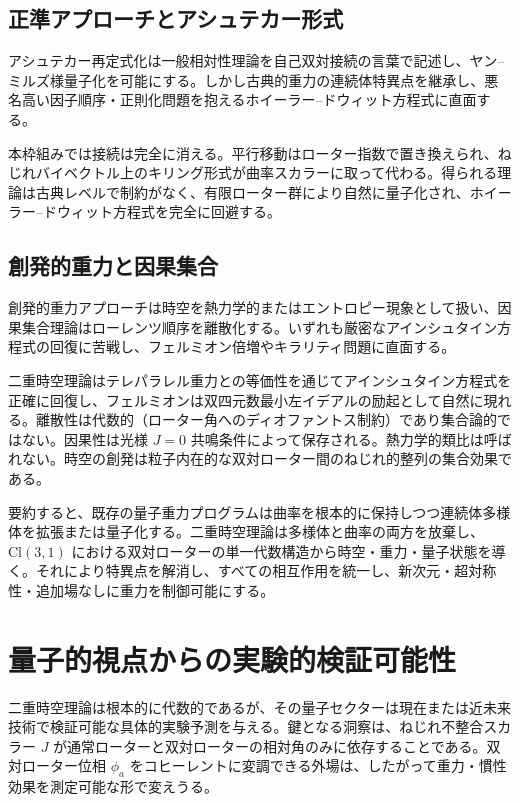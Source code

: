 \documentclass[a4paper]{article}
\begin{document}
\subsection{正準アプローチとアシュテカー形式}

アシュテカー再定式化は一般相対性理論を自己双対接続の言葉で記述し、ヤン--ミルズ様量子化を可能にする。しかし古典的重力の連続体特異点を継承し、悪名高い因子順序・正則化問題を抱えるホイーラー--ドウィット方程式に直面する。

本枠組みでは接続は完全に消える。平行移動はローター指数で置き換えられ、ねじれバイベクトル上のキリング形式が曲率スカラーに取って代わる。得られる理論は古典レベルで制約がなく、有限ローター群により自然に量子化され、ホイーラー--ドウィット方程式を完全に回避する。

\subsection{創発的重力と因果集合}

創発的重力アプローチは時空を熱力学的またはエントロピー現象として扱い、因果集合理論はローレンツ順序を離散化する。いずれも厳密なアインシュタイン方程式の回復に苦戦し、フェルミオン倍増やキラリティ問題に直面する。

二重時空理論はテレパラレル重力との等価性を通じてアインシュタイン方程式を正確に回復し、フェルミオンは双四元数最小左イデアルの励起として自然に現れる。離散性は代数的（ローター角へのディオファントス制約）であり集合論的ではない。因果性は光様 $J=0$ 共鳴条件によって保存される。熱力学的類比は呼ばれない。時空の創発は粒子内在的な双対ローター間のねじれ的整列の集合効果である。

要約すると、既存の量子重力プログラムは曲率を根本的に保持しつつ連続体多様体を拡張または量子化する。二重時空理論は多様体と曲率の両方を放棄し、$\mathrm{Cl}(3,1)$ における双対ローターの単一代数構造から時空・重力・量子状態を導く。それにより特異点を解消し、すべての相互作用を統一し、新次元・超対称性・追加場なしに重力を制御可能にする。

\section{量子的視点からの実験的検証可能性}
\label{sec:experiments}

二重時空理論は根本的に代数的であるが、その量子セクターは現在または近未来技術で検証可能な具体的実験予測を与える。鍵となる洞察は、ねじれ不整合スカラー $J$ が通常ローターと双対ローターの相対角のみに依存することである。双対ローター位相 $\phi_a$ をコヒーレントに変調できる外場は、したがって重力・慣性効果を測定可能な形で変えうる。
\end{document}
